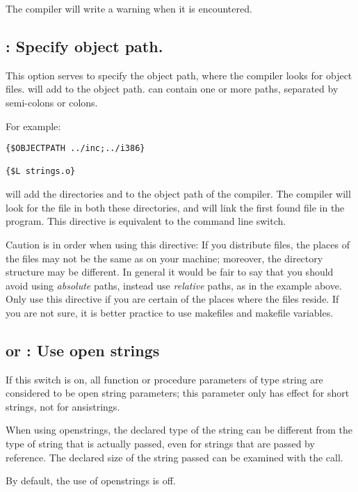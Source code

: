 The compiler will write a warning when it is encountered.

\subsection{ : Specify object path.}

This option serves to specify the object path, where the compiler looks for
object files.  will add  to the object
path.  can contain one or more paths, separated by semi-colons or
colons.

For example:
\begin{verbatim}
{$OBJECTPATH ../inc;../i386}

{$L strings.o}
\end{verbatim}

will add the directories  and  to the
object path of the compiler. The compiler will look for the file 
in both these directories, and will link the first found file in the
program. This directive is equivalent to the  command line switch.

Caution is in order when using this directive: If you distribute files, the
places of the files may not be the same as on your machine; moreover, the
directory structure may be different. In general it would be fair to say
that you should avoid using {\em absolute} paths, instead use {\em relative}
paths, as in the example above. Only use this directive if you are certain
of the places where the files reside. If you are not sure, it is better
practice to use makefiles and makefile variables.

\subsection{ or  : Use open strings}

If this switch is on, all function or procedure parameters of type string
are considered to be open string parameters; this parameter only has effect
for short strings, not for ansistrings.

When using openstrings, the declared type of the string can be different
from the type of string that is actually passed, even for strings that are
passed by reference. The declared size of the string passed can be examined
with the  call.

By default, the use of openstrings is off.

